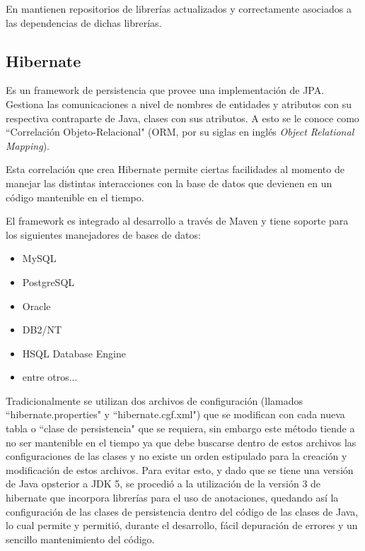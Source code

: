         En \cite{APACHE-maven} mantienen repositorios de librerías actualizados y correctamente asociados a las dependencias de dichas librerías.
        
        \subsection{Hibernate}
        \label{tecno-hibernate}
        
        Es un framework de persistencia que provee una implementación de JPA\cite{HIBERNATE-basico}. Gestiona las comunicaciones a nivel de nombres de entidades y atributos con su respectiva contraparte de Java, clases con sus atributos. A esto se le conoce como ``Correlación Objeto-Relacional" (ORM, por su siglas en inglés \textit{Object Relational Mapping}).
        
        Esta correlación que crea Hibernate permite ciertas facilidades al momento de manejar las distintas interacciones con la base de datos que devienen en un código mantenible en el tiempo.
        
        El framework es integrado al desarrollo a través de Maven y tiene soporte para los siguientes manejadores de bases de datos\cite{HIBERNATE-tutorial}: 
        \begin{itemize}
            \item MySQL
            \item PostgreSQL
            \item Oracle
            \item DB2/NT
            \item HSQL Database Engine
            \item entre otros...
        \end{itemize}
        
        Tradicionalmente se utilizan dos archivos de configuración (llamados ``hibernate.properties" y ``hibernate.cgf.xml") que se modifican con cada nueva tabla o ``clase de persistencia" que se requiera, sin embargo este método tiende a no ser mantenible en el tiempo ya que debe buscarse dentro de estos archivos las configuraciones de las clases y no existe un orden estipulado para la creación y modificación de estos archivos. Para evitar esto, y dado que se tiene una versión de Java opsterior a JDK 5, se procedió a la utilización de la versión 3 de hibernate que incorpora librerías para el uso de anotaciones, quedando así la configuración de las clases de persistencia dentro del código de las clases de Java, lo cual permite y permitió, durante el desarrollo, fácil depuración de errores y un sencillo mantenimiento del código.
        
